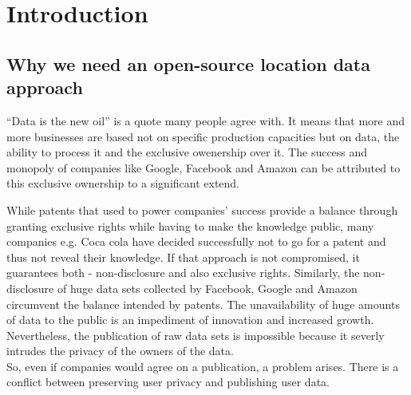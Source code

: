 
\chapter{Introduction}\label{chapter:introduction}
\section{Why we need an open-source location data approach}\label{chapter:introduction:section:motivation}

“Data is the new oil” is a quote many people agree with. It means that more and more businesses are
based not on specific production capacities but on data, the ability to process it and the exclusive owenership over it. The success and monopoly of
companies like Google, Facebook and Amazon can be attributed to this exclusive ownership to a significant extend.

While patents that used to power companies' success provide a balance through granting exclusive rights while having to make the knowledge public, many companies e.g. Coca cola have decided successfully not to go for a patent and thus not reveal their knowledge. If that approach is not compromised, it guarantees both - non-disclosure and also exclusive rights. Similarly, the non-disclosure of huge data sets collected by Facebook, Google and Amazon circumvent the balance intended by patents. The unavailability of huge amounts of data to the public is an impediment of innovation and increased growth.
Nevertheless, the publication of raw data sets is impossible because it severly intrudes the privacy of the owners of the data.\\

So, even if companies would agree on a publication, a problem arises.
There is a conflict between preserving user privacy and publishing user data.\\

